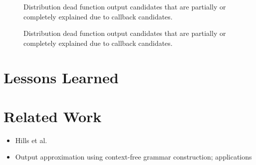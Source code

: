 \documentclass[preprint]{sig-alternate-05-2015}
\begin{document}
\begin{figure}[p]
	
	\caption{Distribution dead function output candidates that are partially or
	completely explained due to callback candidates.}
	\label{fig:output_candidate_explanation}
\end{figure}


\begin{figure}[p]
	
	\caption{Distribution dead function output candidates that are partially or
	completely explained due to callback candidates.}
	\label{fig:coveragestuff}
\end{figure}


\section{Lessons Learned}

\section{Related Work}
\begin{itemize}
	\item Hills et al. \cite{Hills:2013:ESP:2483760.2483786}
	\item Output approximation using context-free grammar construction; applications \cite{minamide2005static,wassermann2007sound}
\end{itemize}



\end{document}
